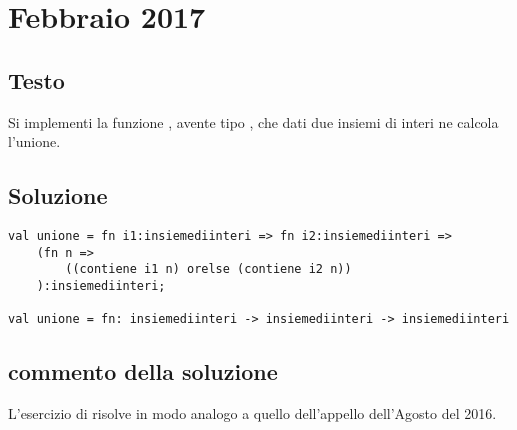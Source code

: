 \section{Febbraio 2017}

\subsection{Testo}

Si implementi la funzione , avente tipo , che dati due insiemi di interi ne calcola l'unione.

\subsection{Soluzione}

\begin{lstlisting}[style = SML, caption = {Definizione della funzione \sml{unione}}]
val unione = fn i1:insiemediinteri => fn i2:insiemediinteri =>
	(fn n =>
		((contiene i1 n) orelse (contiene i2 n))
	):insiemediinteri;

val unione = fn: insiemediinteri -> insiemediinteri -> insiemediinteri
\end{lstlisting}

\subsection{commento della soluzione}

L'esercizio di risolve in modo analogo a quello dell'appello dell'Agosto del 2016.
